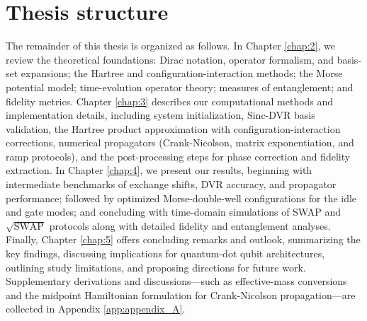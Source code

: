 \documentclass{subfiles}
\begin{document}
\section{Thesis structure}
The remainder of this thesis is organized as follows. In Chapter \ref{chap:2}, we review the theoretical foundations: Dirac notation, operator formalism, and basis-set expansions; the Hartree and configuration-interaction methods; the Morse potential model; time-evolution operator theory; measures of entanglement; and fidelity metrics. Chapter \ref{chap:3} describes our computational methods and implementation details, including system initialization, Sinc-DVR basis validation, the Hartree product approximation with configuration-interaction corrections, numerical propagators (Crank-Nicolson, matrix exponentiation, and ramp protocols), and the post-processing steps for phase correction and fidelity extraction. In Chapter \ref{chap:4}, we present our results, beginning with intermediate benchmarks of exchange shifts, DVR accuracy, and propagator performance; followed by optimized Morse-double-well configurations for the idle and gate modes; and concluding with time-domain simulations of SWAP and $\sqrt{\mathrm{SWAP}}$ protocols along with detailed fidelity and entanglement analyses. Finally, Chapter \ref{chap:5} offers concluding remarks and outlook, summarizing the key findings, discussing implications for quantum-dot qubit architectures, outlining study limitations, and proposing directions for future work. Supplementary derivations and discussions—such as effective-mass conversions and the midpoint Hamiltonian formulation for Crank-Nicolson propagation—are collected in Appendix \ref{app:appendix_A}.
\end{document}
